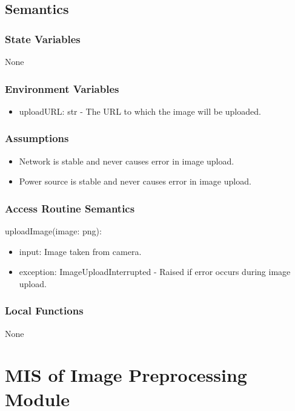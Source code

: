 \documentclass[12pt, titlepage]{article}
\begin{document}
\subsection{Semantics}

\subsubsection{State Variables}
None

\subsubsection{Environment Variables}
\begin{itemize}
  \item uploadURL: str - The URL to which the image will be uploaded.
\end{itemize}

\subsubsection{Assumptions}
\begin{itemize}
	\item Network is stable and never causes error in image upload.
	\item Power source is stable and never causes error in image upload.
\end{itemize}

\subsubsection{Access Routine Semantics}

\noindent uploadImage(image: png):
\begin{itemize}
\item input: Image taken from camera. 
\item exception: ImageUploadInterrupted - Raised if error occurs during image upload.
\end{itemize}

\subsubsection{Local Functions}

None

\newpage



\section{MIS of Image Preprocessing Module} \label{Module} 
\end{document}
